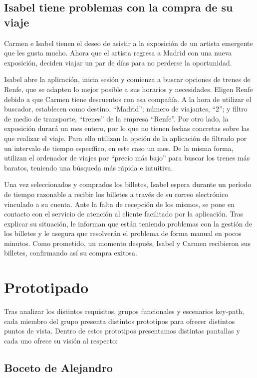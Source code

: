 \subsection{Isabel tiene problemas con la compra de su viaje}

Carmen e Isabel tienen el deseo de asistir a la exposición de un artista emergente que les gusta mucho. Ahora que el artista regresa a Madrid con una nueva exposición, deciden viajar un par de días para no perderse la oportunidad.

Isabel abre la aplicación, inicia sesión y comienza a buscar opciones de trenes de Renfe, que se adapten lo mejor posible a sus horarios y necesidades. Eligen Renfe debido a que Carmen tiene descuentos con esa compañía. A la hora de utilizar el buscador, establecen como destino, “Madrid”; número de viajantes, “2”; y filtro de medio de transporte, “trenes” de la empresa “Renfe”. 
Por otro lado, la exposición durará un mes entero, por lo que no tienen fechas concretas sobre las que realizar el viaje. Para ello utilizan la opción de la aplicación de filtrado por un intervalo de tiempo específico, en este caso un mes. De la misma forma, utilizan el ordenador de viajes por “precio más bajo” para buscar los trenes más baratos, teniendo una búsqueda más rápida e intuitiva.

Una vez seleccionados y comprados los billetes, Isabel espera durante un período de tiempo razonable a recibir los billetes a través de su correo electrónico vinculado a su cuenta. Ante la falta de recepción de los mismos, se pone en contacto con el servicio de atención al cliente facilitado por la aplicación. Tras explicar su situación, le informan que están teniendo problemas con la gestión de los billetes y le asegura que resolverán el problema de forma manual en pocos minutos. 
Como prometido, un momento después, Isabel y Carmen recibieron sus billetes, confirmando así su compra exitosa.

\section{Prototipado}

Tras analizar los distintos requisitos, grupos funcionales y escenarios key-path, cada miembro del grupo presenta distintos prototipos para ofrecer distintos puntos de vista. Dentro de estos prototipos presentamos distintas pantallas y cada uno ofrece su visión al respecto:

\subsection{Boceto de Alejandro}

